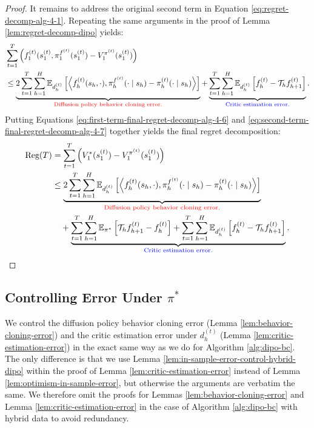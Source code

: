 \begin{proof}
    
    It remains to address the original second term in Equation \ref{eq:regret-decomp-alg-4-1}. Repeating the same arguments in the proof of Lemma \ref{lem:regret-decomp-dipo} yields:
    \begin{align}
        &\sum_{t=1}^T\left(f_1^{(t)}(s_1^{(t)}, \pi_1^{f^{(t)}}(s_1^{(t)})-V_1^{\pi^{(t)}}(s_1^{(t)})\right)  \\
        &\leq \underbrace{2\sum_{t=1}^T\sum_{h=1}^H \mathbb{E}_{d_h^{(t)}}\left[\left\langle f_h^{(t)}(s_h, \cdot), \pi_h^{f^{(t)}}(\cdot \mid s_h)-\pi_h^{(t)}(\cdot \mid s_h)\right\rangle\right]}_{\textcolor{red}{\text{Diffusion policy behavior cloning error.}}} + \underbrace{\sum_{t=1}^T \sum_{h=1}^H \mathbb{E}_{d_h^{(t)}}\left[f_h^{(t)}-{\mathcal{T}}_h f_{h+1}^{(t)}\right]}_{\textcolor{blue}{\text{Critic estimation error.}}}.
        \label{eq:second-term-final-regret-decomp-alg-4-7}
    \end{align}
    Putting Equations \ref{eq:first-term-final-regret-decomp-alg-4-6} and \ref{eq:second-term-final-regret-decomp-alg-4-7} together yields the final regret decomposition:
    \begin{align}
        \text{Reg}(T) &= \sum_{t=1}^T\left(V_1^{*}(s_1^{(t)})-V_1^{\pi^{(t)}}(s_1^{(t)})\right) \\
        &\leq \underbrace{2\sum_{t=1}^T\sum_{h=1}^H \mathbb{E}_{d_h^{(t)}}\left[\left\langle f_h^{(t)}(s_h, \cdot), \pi_h^{f^{(t)}}(\cdot \mid s_h)-\pi_h^{(t)}(\cdot \mid s_h)\right\rangle\right]}_{\textcolor{red}{\text{Diffusion policy behavior cloning error.}}} \\
        &\quad+ \underbrace{\sum_{t=1}^T \sum_{h=1}^H \mathbb{E}_{\pi^*}\left[\mathcal{T}_h f_{h+1}^{(t)}- f_h^{(t)}\right] + \sum_{t=1}^T \sum_{h=1}^H \mathbb{E}_{d_h^{(t)}}\left[f_h^{(t)}-{\mathcal{T}}_h f_{h+1}^{(t)}\right]}_{\textcolor{blue}{\text{Critic estimation error.}}} .
    \end{align}
\end{proof}

\subsection{Controlling Error Under $\pi^*$}

We control the diffusion policy behavior cloning error (Lemma \ref{lem:behavior-cloning-error}) and the critic estimation error under $d_h^{(t)}$ (Lemma \ref{lem:critic-estimation-error}) in the exact same way as we do for Algorithm \ref{alg:dipo-bc}. The only difference is that we use Lemma \ref{lem:in-sample-error-control-hybrid-dipo} within the proof of Lemma \ref{lem:critic-estimation-error} instead of Lemma \ref{lem:optimism-in-sample-error}, but otherwise the arguments are verbatim the same. We therefore omit the proofs for Lemmas \ref{lem:behavior-cloning-error} and Lemma \ref{lem:critic-estimation-error} in the case of Algorithm \ref{alg:dipo-bc} with hybrid data to avoid redundancy.


